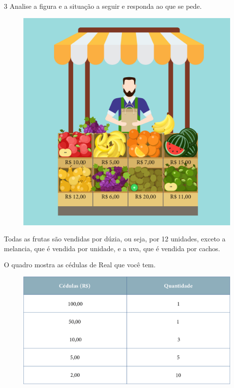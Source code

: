 
\num{3} Analise a figura e a situação a seguir e responda ao que se pede.



\begin{figure}[htpb!]
\centering
\includegraphics[width=.6\textwidth]{./media/image65.png}
\end{figure}

Todas as frutas são vendidas por dúzia, ou seja, por 12 unidades, exceto
a melancia, que é vendida por unidade, e a uva, que é vendida por cachos.

O quadro mostra as cédulas de Real que você tem.

\begin{figure}[htpb!]
\includegraphics[width=\textwidth]{./media/image66.png}
\end{figure}

